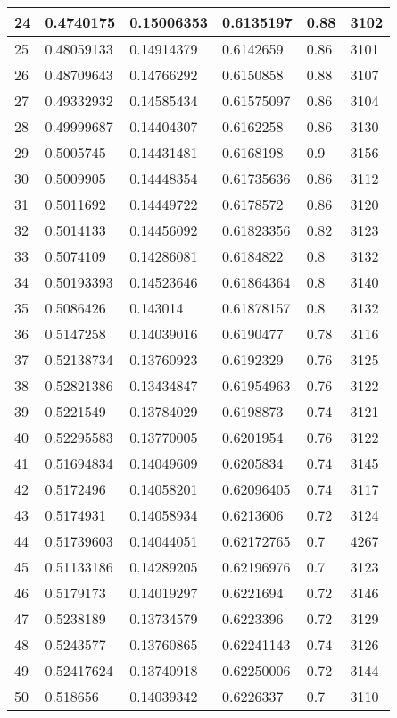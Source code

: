\begin{longtable}{|l|l|l|l|l|l|}
24 & 0.4740175 & 0.15006353 & 0.6135197 & 0.88 & 3102 \\ \hline 
25 & 0.48059133 & 0.14914379 & 0.6142659 & 0.86 & 3101 \\ \hline 
26 & 0.48709643 & 0.14766292 & 0.6150858 & 0.88 & 3107 \\ \hline 
27 & 0.49332932 & 0.14585434 & 0.61575097 & 0.86 & 3104 \\ \hline 
28 & 0.49999687 & 0.14404307 & 0.6162258 & 0.86 & 3130 \\ \hline 
29 & 0.5005745 & 0.14431481 & 0.6168198 & 0.9 & 3156 \\ \hline 
30 & 0.5009905 & 0.14448354 & 0.61735636 & 0.86 & 3112 \\ \hline 
31 & 0.5011692 & 0.14449722 & 0.6178572 & 0.86 & 3120 \\ \hline 
32 & 0.5014133 & 0.14456092 & 0.61823356 & 0.82 & 3123 \\ \hline 
33 & 0.5074109 & 0.14286081 & 0.6184822 & 0.8 & 3132 \\ \hline 
34 & 0.50193393 & 0.14523646 & 0.61864364 & 0.8 & 3140 \\ \hline 
35 & 0.5086426 & 0.143014 & 0.61878157 & 0.8 & 3132 \\ \hline 
36 & 0.5147258 & 0.14039016 & 0.6190477 & 0.78 & 3116 \\ \hline 
37 & 0.52138734 & 0.13760923 & 0.6192329 & 0.76 & 3125 \\ \hline 
38 & 0.52821386 & 0.13434847 & 0.61954963 & 0.76 & 3122 \\ \hline 
39 & 0.5221549 & 0.13784029 & 0.6198873 & 0.74 & 3121 \\ \hline 
40 & 0.52295583 & 0.13770005 & 0.6201954 & 0.76 & 3122 \\ \hline 
41 & 0.51694834 & 0.14049609 & 0.6205834 & 0.74 & 3145 \\ \hline 
42 & 0.5172496 & 0.14058201 & 0.62096405 & 0.74 & 3117 \\ \hline 
43 & 0.5174931 & 0.14058934 & 0.6213606 & 0.72 & 3124 \\ \hline 
44 & 0.51739603 & 0.14044051 & 0.62172765 & 0.7 & 4267 \\ \hline 
45 & 0.51133186 & 0.14289205 & 0.62196976 & 0.7 & 3123 \\ \hline 
46 & 0.5179173 & 0.14019297 & 0.6221694 & 0.72 & 3146 \\ \hline 
47 & 0.5238189 & 0.13734579 & 0.6223396 & 0.72 & 3129 \\ \hline 
48 & 0.5243577 & 0.13760865 & 0.62241143 & 0.74 & 3126 \\ \hline 
49 & 0.52417624 & 0.13740918 & 0.62250006 & 0.72 & 3144 \\ \hline 
50 & 0.518656 & 0.14039342 & 0.6226337 & 0.7 & 3110 \\ \hline 
\end{longtable}